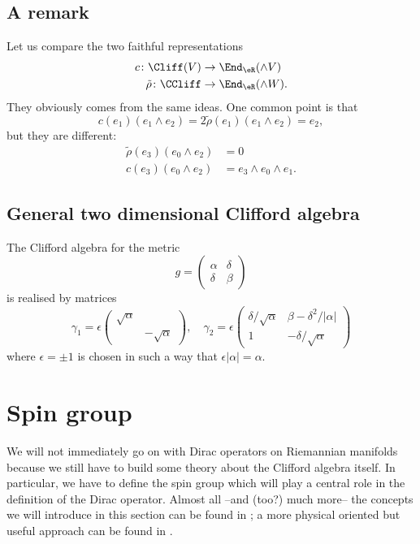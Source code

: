 \subsection{A remark}  %

Let us compare the two faithful representations
\[
	\begin{split}
		c\colon \Cliff(V)&\to \End_{\eR}(\wedge V)\\
		\tilde\rho\colon \CCliff&\to  \End_{\eR}(\wedge W).
	\end{split}
\]
They obviously comes from the same ideas. One common point is that
\[
	c(e_1)(e_1\wedge e_2)=2\tilde\rho (e_1)(e_1\wedge e_2)=e_2,
\]
but they are different:
\[
	\begin{split}
		\tilde\rho(e_3)(e_0\wedge e_2)&=0\\
		c(e_3)(e_0\wedge e_2)&=e_3\wedge e_0\wedge e_1.
	\end{split}
\]

\subsection{General two dimensional Clifford algebra}

The Clifford algebra for the metric
\[
	g=\begin{pmatrix}
		\alpha & \delta \\\delta&\beta
	\end{pmatrix}
\]
is realised by matrices
\[
	\gamma_1=
	\epsilon\begin{pmatrix}
		\sqrt{\alpha} \\ & -\sqrt{\alpha}
	\end{pmatrix},\quad
	\gamma_2=
	\epsilon\begin{pmatrix}
		\delta/\sqrt{\alpha} & \beta-\delta^2/| \alpha | \\
		1                    & -\delta/\sqrt{\alpha}
	\end{pmatrix}
\]
where $\epsilon=\pm 1$ is chosen in such a way that $\epsilon| \alpha |=\alpha$.

\section{Spin group}

We will not immediately go on with Dirac operators on Riemannian manifolds because we still have to build some theory about the Clifford algebra itself. In particular, we have to define the spin group which will play a central role in the definition of the Dirac operator. Almost all --and (too?) much more-- the concepts we will introduce in this section can be found in \cite{Chevalley}; a more physical oriented but useful approach can be found in \cite{Preparation}.

